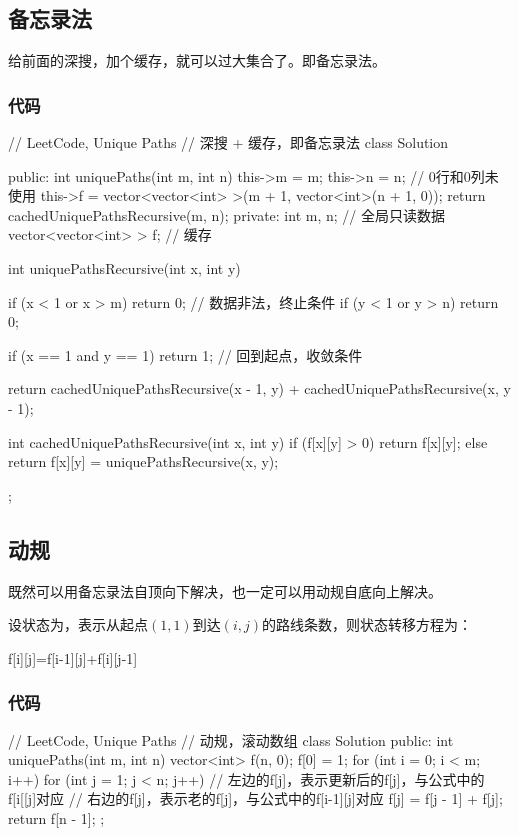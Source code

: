 \subsection{备忘录法}
给前面的深搜，加个缓存，就可以过大集合了。即备忘录法。

\subsubsection{代码}
\begin{Code}
// LeetCode, Unique Paths
// 深搜 + 缓存，即备忘录法
class Solution {
public:
    int uniquePaths(int m, int n) {
        this->m = m;
        this->n = n;
        // 0行和0列未使用
        this->f = vector<vector<int> >(m + 1, vector<int>(n + 1, 0));
        return cachedUniquePathsRecursive(m, n);
    }
private:
    int m, n;  // 全局只读数据
    vector<vector<int> > f;  // 缓存

    int uniquePathsRecursive(int x, int y) {
        if (x < 1 or x > m) return 0; // 数据非法，终止条件
        if (y < 1 or y > n) return 0;

        if (x == 1 and y == 1) return 1; // 回到起点，收敛条件

        return cachedUniquePathsRecursive(x - 1, y) +
                cachedUniquePathsRecursive(x, y - 1);
    }

    int cachedUniquePathsRecursive(int x, int y) {
        if (f[x][y] > 0) return f[x][y];
        else return f[x][y] = uniquePathsRecursive(x, y);
    }
};
\end{Code}


\subsection{动规}
既然可以用备忘录法自顶向下解决，也一定可以用动规自底向上解决。

设状态为，表示从起点$(1,1)$到达$(i,j)$的路线条数，则状态转移方程为：
\begin{Code}
f[i][j]=f[i-1][j]+f[i][j-1]
\end{Code}


\subsubsection{代码}
\begin{Code}
// LeetCode, Unique Paths
// 动规，滚动数组
class Solution {
public:
    int uniquePaths(int m, int n) {
        vector<int> f(n, 0);
        f[0] = 1;
        for (int i = 0; i < m; i++) {
            for (int j = 1; j < n; j++) {
                // 左边的f[j]，表示更新后的f[j]，与公式中的f[i[[j]对应
                // 右边的f[j]，表示老的f[j]，与公式中的f[i-1][j]对应
                f[j] = f[j - 1] + f[j];
            }
        }
        return f[n - 1];
    }
};
\end{Code}


